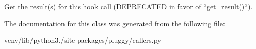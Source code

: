 \begin{DoxyVerb}Get the result(s) for this hook call (DEPRECATED in favor of ``get_result()``).\end{DoxyVerb}
 

The documentation for this class was generated from the following file\+:\begin{DoxyCompactItemize}
\item 
venv/lib/python3./site-\/packages/pluggy/callers.\+py\end{DoxyCompactItemize}
